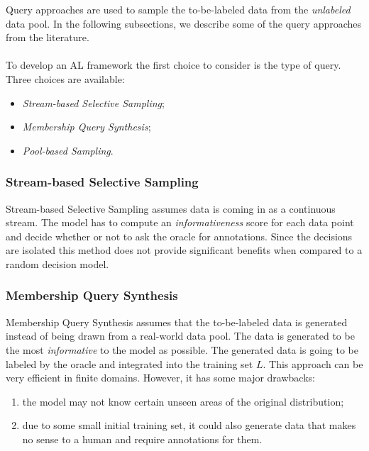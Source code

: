     Query approaches are used to sample the to-be-labeled data from the \emph{unlabeled} data pool. In the following subsections, we describe some of the query approaches from the literature.
    \\
    \\
    To develop an AL framework the first choice to consider is the type of query. Three choices are available:
    \begin{itemize}
        \item \emph{Stream-based Selective Sampling};
        \item \emph{Membership Query Synthesis};
        \item \emph{Pool-based Sampling}.
    \end{itemize}
    
    \subsubsection*{Stream-based Selective Sampling}
    Stream-based Selective Sampling assumes data is coming in as a continuous stream. The model has to compute an \emph{informativeness} score for each data point and decide whether or not to ask the oracle for annotations.
    Since the decisions are isolated this method does not provide significant benefits when compared to a random decision model.
    
    
    \subsubsection*{Membership Query Synthesis}
    Membership Query Synthesis assumes that the to-be-labeled data is generated instead of being drawn from a real-world data pool.
    The data is generated to be the most \emph{informative} to the model as possible. The generated data is going to be labeled by the oracle and integrated into the training set $L$.
    This approach can be very efficient in finite domains. However, it has some major drawbacks:
    \begin{enumerate}
        \item the model may not know certain unseen areas of the original distribution;
        \item due to some small initial training set, it could also generate data that makes no sense to a human and require annotations for them.
    \end{enumerate}
    
